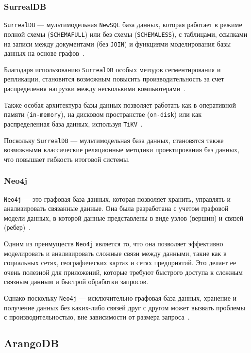 \subsubsection{SurrealDB}

\texttt{SurrealDB} --- мультимодельная \texttt{NewSQL} база данных, которая работает в режиме полной схемы (\texttt{SCHEMAFULL}) или без схемы (\texttt{SCHEMALESS}), с таблицами, ссылками на записи между документами (без \texttt{JOIN}) и функциями моделирования базы данных на основе графов~\cite{surrealdb}.

Благодаря использованию \texttt{SurrealDB} особых методов сегментирования и репликации, становится возможным повысить производительность за счет распределения нагрузки между несколькими компьютерами~\cite{surrealarch}.

Также особая архитектура базы данных позволяет работать как в оперативной памяти (\texttt{in-memory}), на дисковом пространстве (\texttt{on-disk}) или как распределенная база данных, используя \texttt{TiKV}~\cite{tikv}.

Поскольку \texttt{SurrealDB} --- мультимодельная база данных, становятся также возможными классические реляционные методики проектирования баз данных, что повышает гибкость итоговой системы.

\subsubsection{Neo4j}

\texttt{Neo4j} --- это графовая база данных, которая позволяет хранить, управлять и анализировать связанные данные. 
Она была разработана с учетом графовой модели данных, в которой данные представлены в виде узлов (вершин) и связей (ребер)~\cite{neo4j}. 

Одним из преимуществ \texttt{Neo4j} является то, что она позволяет эффективно моделировать и анализировать сложные связи между данными, такие как в социальных сетях, географических картах и сетях предприятий.
Это делает ее очень полезной для приложений, которые требуют быстрого доступа к сложным связным данным и быстрой обработки запросов.

Однако поскольку \texttt{Neo4j} --- исключительно графовая база данных, хранение и получение данных без каких-либо связей друг с другом может вызвать проблемы с производительностью, вне зависимости от размера запроса~\cite{neocons}.

\subsection{ArangoDB}

